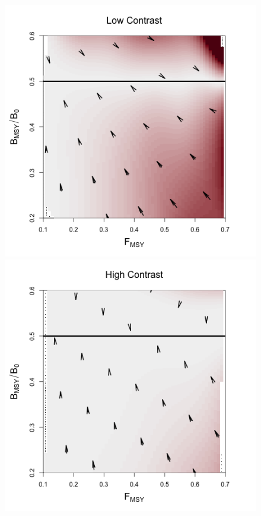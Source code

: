 \documentclass[12pt]{article}
\begin{document}
%

\begin{figure}[h!]
\begin{minipage}[h!]{0.44\textwidth}
\includegraphics[width=\textwidth]{../ptNew/directionalBiasSubPTFlatT30.png}
\end{minipage}
\begin{minipage}[h!]{0.44\textwidth}
\includegraphics[width=\textwidth]{../ptNew/directionalBiasSubPTExpT45MinCon.png}

\end{minipage}
\end{figure}
\end{document}
